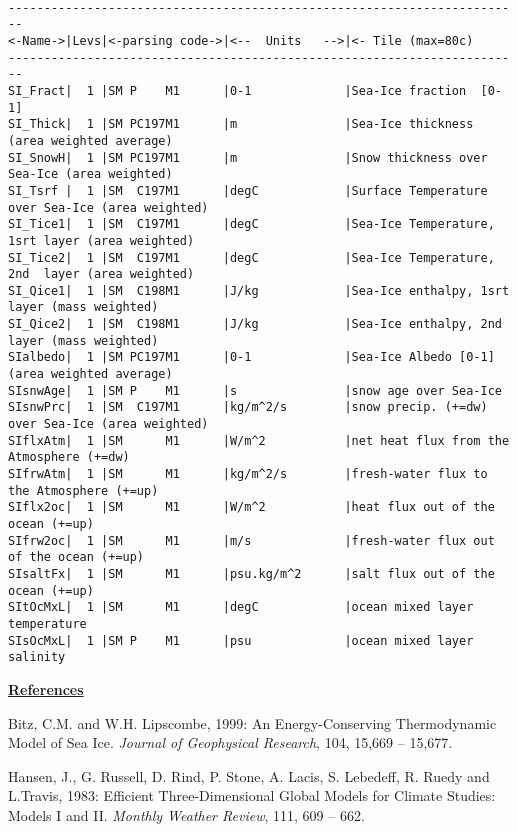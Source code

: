 {\footnotesize
\begin{verbatim}

------------------------------------------------------------------------
<-Name->|Levs|<-parsing code->|<--  Units   -->|<- Tile (max=80c) 
------------------------------------------------------------------------
SI_Fract|  1 |SM P    M1      |0-1             |Sea-Ice fraction  [0-1]
SI_Thick|  1 |SM PC197M1      |m               |Sea-Ice thickness (area weighted average)
SI_SnowH|  1 |SM PC197M1      |m               |Snow thickness over Sea-Ice (area weighted)
SI_Tsrf |  1 |SM  C197M1      |degC            |Surface Temperature over Sea-Ice (area weighted)
SI_Tice1|  1 |SM  C197M1      |degC            |Sea-Ice Temperature, 1srt layer (area weighted)
SI_Tice2|  1 |SM  C197M1      |degC            |Sea-Ice Temperature, 2nd  layer (area weighted)
SI_Qice1|  1 |SM  C198M1      |J/kg            |Sea-Ice enthalpy, 1srt layer (mass weighted)
SI_Qice2|  1 |SM  C198M1      |J/kg            |Sea-Ice enthalpy, 2nd  layer (mass weighted)
SIalbedo|  1 |SM PC197M1      |0-1             |Sea-Ice Albedo [0-1] (area weighted average)
SIsnwAge|  1 |SM P    M1      |s               |snow age over Sea-Ice
SIsnwPrc|  1 |SM  C197M1      |kg/m^2/s        |snow precip. (+=dw) over Sea-Ice (area weighted)
SIflxAtm|  1 |SM      M1      |W/m^2           |net heat flux from the Atmosphere (+=dw)
SIfrwAtm|  1 |SM      M1      |kg/m^2/s        |fresh-water flux to the Atmosphere (+=up)
SIflx2oc|  1 |SM      M1      |W/m^2           |heat flux out of the ocean (+=up)
SIfrw2oc|  1 |SM      M1      |m/s             |fresh-water flux out of the ocean (+=up)
SIsaltFx|  1 |SM      M1      |psu.kg/m^2      |salt flux out of the ocean (+=up)
SItOcMxL|  1 |SM      M1      |degC            |ocean mixed layer temperature
SIsOcMxL|  1 |SM P    M1      |psu             |ocean mixed layer salinity
\end{verbatim}
}

\vspace{1cm}

\noindent 
{\bf {\underline{References}}}

\noindent
Bitz, C.M. and W.H. Lipscombe, 1999: An Energy-Conserving
Thermodynamic Model of Sea Ice.
{\it Journal of Geophysical Research}, 104, 15,669 -- 15,677.

\vspace{.2cm}

\noindent
Hansen, J., G. Russell, D. Rind, P. Stone, A. Lacis, S. Lebedeff,
R. Ruedy and L.Travis, 1983: Efficient Three-Dimensional
Global Models for Climate Studies: Models I and II.
{\it Monthly Weather Review}, 111, 609 -- 662.

